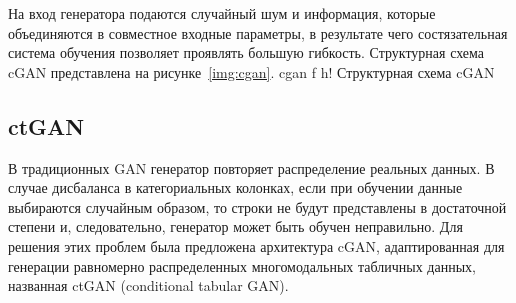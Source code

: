 На вход генератора подаются случайный шум и информация, которые объединяются в совместное входные параметры, в результате чего состязательная система обучения позволяет проявлять большую гибкость.
\newpage
Структурная схема cGAN представлена на рисунке~\ref{img:cgan}.
{cgan} %
{f} %
{h!} %
{\textwidth} %
{Структурная схема cGAN } %

\subsection{ctGAN}

В традиционных GAN генератор повторяет распределение реальных данных.
В случае дисбаланса в категориальных колонках, если при обучении данные выбираются случайным образом, то строки не будут представлены в достаточной степени и, следовательно, генератор может быть обучен неправильно.
Для решения этих проблем была предложена архитектура cGAN, адаптированная для генерации равномерно распределенных многомодальных табличных данных, названная ctGAN (conditional tabular GAN).~\cite{ctgan}








